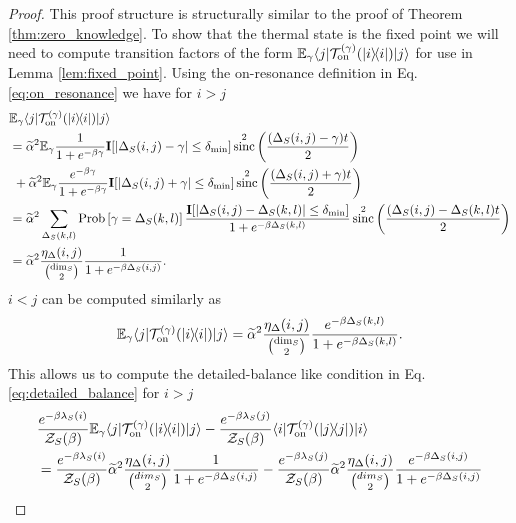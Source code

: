 \documentclass{article}
\newcommand{\on}{\rm on}
\newcommand{\ket}[1]{|#1\rangle}
\newcommand{\bra}[1]{\langle #1|}
\newcommand{\ketbra}[2]{| #1\rangle\! \langle #2|}
\newcommand{\EE}{\mathbb{E}}
\newcommand{\TT}{\mathcal{T}}
\newcommand{\prob}[1]{{\rm Prob}\left[ #1 \right]}
\newcommand{\partfun}{\mathcal{Z}}
\DeclareMathOperator{\sinc}{sinc}
\begin{document}
\begin{proof}
This proof structure is structurally similar to the proof of Theorem \ref{thm:zero_knowledge}.
To show that the thermal state is the fixed point we will need to compute transition factors of the form $\EE_\gamma \bra{j}\TT_{\on}^{(\gamma)}(\ketbra{i}{i})\ket{j}$ for use in Lemma \ref{lem:fixed_point}. Using the on-resonance definition in Eq. \eqref{eq:on_resonance} we have for $i > j$
\begin{align}
    &\EE_\gamma \bra{j} \TT_{\on}^{(\gamma)}(\ketbra{i}{i})\ket{j} \nonumber \\
    &=  \widetilde{\alpha}^2 \EE_{\gamma} \frac{1}{1 + e^{-\beta \gamma}} \mathbf{I}[|\Delta_S(i,j) - \gamma| \le \delta_{\min}]  \sinc^2\left(\frac{(\Delta_S(i,j) - \gamma)t}{2}\right) \nonumber \\
    &~+ \widetilde{\alpha}^2 \EE_{\gamma} \frac{e^{-\beta \gamma}}{1 + e^{-\beta \gamma}} \mathbf{I}[|\Delta_S(i,j) + \gamma| \le \delta_{\min}]  \sinc^2\left(\frac{(\Delta_S(i,j) + \gamma)t}{2}\right) \\
    &= \widetilde{\alpha}^2 \sum_{\Delta_S(k,l)} \prob{\gamma = \Delta_S(k,l)} \frac{\mathbf{I}[|\Delta_S(i,j) - \Delta_S(k,l)| \le \delta_{\min}]}{1 + e^{-\beta \Delta_S(k,l)}}   \sinc^2\left(\frac{(\Delta_S(i,j) - \Delta_S(k,l)t}{2}\right) \\
    &= \widetilde{\alpha}^2 \frac{\eta_\Delta(i,j)}{\binom{\dim_S}{2}} \frac{1}{1 + e^{-\beta \Delta_S(i,j)}}.
\end{align}
$i < j$ can be computed similarly as
\begin{equation}
    \EE_\gamma \bra{j} \TT_{\on}^{(\gamma)}(\ketbra{i}{i})\ket{j} = \widetilde{\alpha}^2 \frac{\eta_\Delta(i,j)}{\binom{\dim_S}{2}} \frac{e^{-\beta \Delta_S(k,l)}}{1 + e^{-\beta \Delta_S(k,l)}}.
\end{equation}
This allows us to compute the detailed-balance like condition in Eq. \eqref{eq:detailed_balance} for $i > j$
\begin{align}
    &\frac{e^{-\beta \lambda_S(i)}}{\partfun_S(\beta)} \EE_\gamma \bra{j} \TT_{\on}^{(\gamma)}(\ketbra{i}{i}) \ket{j} - \frac{e^{-\beta \lambda_S(j)}}{\partfun_S(\beta)} \bra{i} \TT_{\on}^{(\gamma)}(\ketbra{j}{j}) \ket{i} \nonumber \\
    &= \frac{e^{-\beta \lambda_S(i)}}{\partfun_S(\beta)} \widetilde{\alpha}^2 \frac{\eta_\Delta(i,j)}{\binom{dim_S}{2}} \frac{1}{1 + e^{-\beta \Delta_S(i,j)}} - \frac{e^{-\beta \lambda_S(j)}}{\partfun_S(\beta)} \widetilde{\alpha}^2 \frac{\eta_\Delta(i,j)}{\binom{dim_S}{2}} \frac{e^{-\beta \Delta_S(i,j)}}{1 + e^{-\beta \Delta_S(i,j)}} \\

\end{align}
\end{proof}
\end{document}
